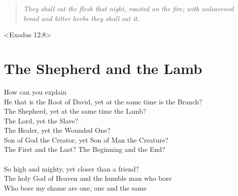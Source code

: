 \documentclass[10pt,oneside,footinclude=true,headinclude=true]{scrbook} %
\newcommand\quot[1]{
	\begin{quote}\textit{\small#1}\end{quote}
}
\begin{document}
\quot{They shall eat the flesh that night, roasted on the fire; with unleavened bread and bitter herbs they shall eat it.}
<Exodus 12:8>


\chapter{The Shepherd and the Lamb}
How can you explain\\
He that is the Root of David, yet at the same time is the Branch?\\
The Shepherd, yet at the same time the Lamb?\\
The Lord, yet the Slave?\\
The Healer, yet the Wounded One?\\
Son of God the Creator, yet Son of Man the Creature?\\
The First and the Last? The Beginning and the End?\\
\\
So high and mighty, yet closer than a friend?\\
The holy God of Heaven and the humble man who bore\\
Who bore my shame are one, one and the same\\
\end{document}
